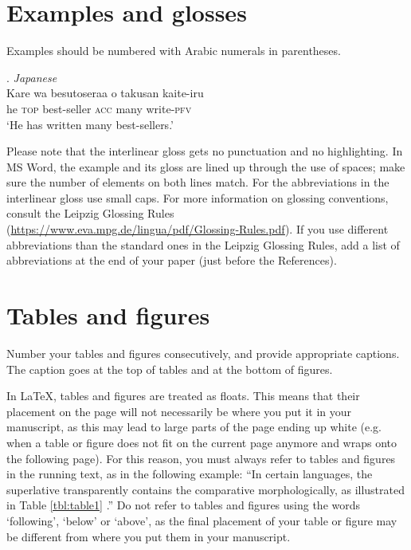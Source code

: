 \documentclass[times,linguex]{lsb}
\begin{document}
\section{Examples and glosses}

Examples should be numbered with Arabic numerals in parentheses.

\ex. \emph{Japanese}\\ %
\gll Kare wa besutoseraa o takusan kaite-iru\\ %
he \textsc{top} best-seller \textsc{acc} many write-\textsc{pfv}\\ %
\glt ‘He has written many best-sellers.’ %

\sloppy
Please note that the interlinear gloss gets no punctuation and no highlighting. In MS Word, the example and its gloss are lined up through the use of spaces; make sure the number of elements on both lines match. For the abbreviations in the interlinear gloss use small caps. For more information on glossing conventions, consult the Leipzig Glossing Rules (\url{https://www.eva.mpg.de/lingua/pdf/Glossing-Rules.pdf}).  If you use different abbreviations than the standard ones in the Leipzig Glossing Rules, add a list of abbreviations at the end of your paper (just before the References).

\section{Tables and figures}

Number your tables and figures consecutively, and provide  appropriate captions. The caption goes at the top of tables and at the bottom of figures.

In \LaTeX, tables and figures are treated as floats. This means that their placement on the page will not necessarily be where you put it in your manuscript, as this may lead to large parts of the page ending up white (e.g. when a table or figure does not fit on the current page anymore and wraps onto the following page). For this reason, you must always refer to tables and figures in the running text, as in the following example: ``In certain languages, the superlative transparently contains the comparative morphologically, as illustrated in Table \ref{tbl:table1} \citep[46]{Bobaljik2012}.'' Do not refer to tables and figures using the words `following', `below' or `above', as the final placement of your table or figure may be different from where you put them in your manuscript.
\end{document}

